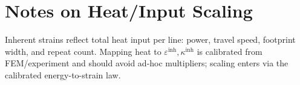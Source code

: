 \documentclass[11pt]{article}
\begin{document}
\section{Notes on Heat/Input Scaling}
Inherent strains reflect total heat input per line: power, travel speed, footprint width, and repeat count. Mapping heat to \(\varepsilon^{\text{inh}}, \kappa^{\text{inh}}\) is calibrated from FEM/experiment and should avoid ad-hoc multipliers; scaling enters via the calibrated energy-to-strain law.
\end{document}

